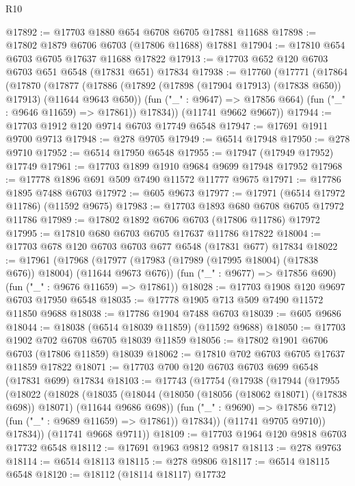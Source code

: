 \begin{lexlean}{R10}
\begin{coremodule}
@17892 := @17703 @1880 @654 @6708 @6705 @17881 @11688
@17898 := @17802 @1879 @6706 @6703 (@17806 @11688) @17881
@17904 := @17810 @654 @6703 @6705 @17637 @11688 @17822
@17913 := @17703 @652 @120 @6703 @6703 @651 @6548 (@17831 @651) @17834
@17938 := @17760
    (@17771
      (@17864
        (@17870
          (@17877
            (@17886 (@17892 (@17898 (@17904 @17913) (@17838 @650)) @17913) (@11644 @9643 @650))
            (fun ("_" : @9647) => @17856 @664)
            (fun ("_" : @9646 @11659) => @17861))
          @17834))
      (@11741 @9662 @9667))
@17944 := @17703 @1912 @120 @9714 @6703 @17749 @6548
@17947 := @17691 @1911 @9700 @9713
@17948 := @278 @9705
@17949 := @6514 @17948
@17950 := @278 @9710
@17952 := @6514 @17950 @6548
@17955 := @17947 (@17949 @17952) @17749
@17961 := @17703 @1899 @1910 @9684 @9699 @17948 @17952
@17968 := @17778 @1896 @691 @509 @7490 @11572 @11777 @9675
@17971 := @17786 @1895 @7488 @6703
@17972 := @605 @9673
@17977 := @17971 (@6514 @17972 @11786) (@11592 @9675)
@17983 := @17703 @1893 @680 @6708 @6705 @17972 @11786
@17989 := @17802 @1892 @6706 @6703 (@17806 @11786) @17972
@17995 := @17810 @680 @6703 @6705 @17637 @11786 @17822
@18004 := @17703 @678 @120 @6703 @6703 @677 @6548 (@17831 @677) @17834
@18022 := @17961
    (@17968
      (@17977 (@17983 (@17989 (@17995 @18004) (@17838 @676)) @18004) (@11644 @9673 @676))
      (fun ("_" : @9677) => @17856 @690)
      (fun ("_" : @9676 @11659) => @17861))
@18028 := @17703 @1908 @120 @9697 @6703 @17950 @6548
@18035 := @17778 @1905 @713 @509 @7490 @11572 @11850 @9688
@18038 := @17786 @1904 @7488 @6703
@18039 := @605 @9686
@18044 := @18038 (@6514 @18039 @11859) (@11592 @9688)
@18050 := @17703 @1902 @702 @6708 @6705 @18039 @11859
@18056 := @17802 @1901 @6706 @6703 (@17806 @11859) @18039
@18062 := @17810 @702 @6703 @6705 @17637 @11859 @17822
@18071 := @17703 @700 @120 @6703 @6703 @699 @6548 (@17831 @699) @17834
@18103 := @17743
    (@17754
      (@17938
        (@17944
          (@17955
            (@18022
              (@18028
                (@18035
                  (@18044
                    (@18050 (@18056 (@18062 @18071) (@17838 @698)) @18071)
                    (@11644 @9686 @698))
                  (fun ("_" : @9690) => @17856 @712)
                  (fun ("_" : @9689 @11659) => @17861))
                @17834))
            (@11741 @9705 @9710))
          @17834))
      (@11741 @9668 @9711))
@18109 := @17703 @1964 @120 @9818 @6703 @17732 @6548
@18112 := @17691 @1963 @9812 @9817
@18113 := @278 @9763
@18114 := @6514 @18113
@18115 := @278 @9806
@18117 := @6514 @18115 @6548
@18120 := @18112 (@18114 @18117) @17732

\end{coremodule}
\end{lexlean}

